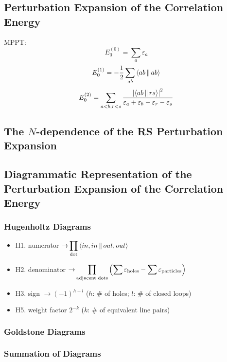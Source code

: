 \documentclass[a4paper]{article}
\DeclareMathOperator{\ra}{\rightarrow}
\newcommand{\dis}{\displaystyle}
\numberwithin{equation}{section}
\begin{document}
\subsection{Perturbation Expansion of the Correlation Energy}
MPPT:
\begin{equation}\label{key}
E_0^{(0)} = \sum_a \varepsilon_a
\end{equation}
\begin{equation}\label{key}
E_0^{(1)} = -\dfrac{1}{2}\sum_{ab} \Braket{ab||ab}
\end{equation}
\begin{align}
E_0^{(2)} = %
\sum_{a<b,r<s} \dfrac{\abs{\Braket{ab||rs}}^2}{\varepsilon_a + \varepsilon_b - \varepsilon_r - \varepsilon_s}
\end{align}

\subsection{The $ N $-dependence of the RS Perturbation Expansion}

\subsection{Diagrammatic Representation of the Perturbation Expansion of the Correlation Energy}
\subsubsection{Hugenholtz Diagrams}
\begin{itemize}
	\item H1. numerator  $\ra \dis\prod_{\text{dot}}\Braket{in,in || out,out} $
	\item H2. denominator $\ra \dis\prod_{\text{adjacent dots}}\qty(\sum \varepsilon_{\text{holes}} - \sum \varepsilon_{\text{particles}})  $
	\item H3. sign $ \ra (-1)^{h+l} $ ($ h $: \# of holes; $ l $: \# of closed loops)
	\item H5. weight factor $ 2^{-k} $ ($ k $: \# of equivalent line pairs)
\end{itemize}

\subsubsection{Goldstone Diagrams}

\subsubsection{Summation of Diagrams}
\end{document}

